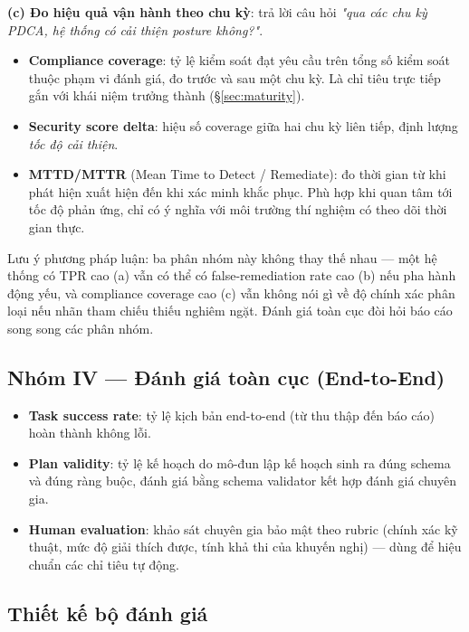 \textbf{(c) Đo hiệu quả vận hành theo chu kỳ}: trả lời câu hỏi \textit{"qua các chu kỳ PDCA, hệ thống có cải thiện posture không?"}.
\begin{itemize}
  \item \textbf{Compliance coverage}: tỷ lệ kiểm soát đạt yêu cầu trên tổng số kiểm soát thuộc phạm vi đánh giá, đo trước và sau một chu kỳ. Là chỉ tiêu trực tiếp gắn với khái niệm trưởng thành (§\ref{sec:maturity}).
  \item \textbf{Security score delta}: hiệu số coverage giữa hai chu kỳ liên tiếp, định lượng \textit{tốc độ cải thiện}.
  \item \textbf{MTTD/MTTR} (Mean Time to Detect / Remediate): đo thời gian từ khi phát hiện xuất hiện đến khi xác minh khắc phục. Phù hợp khi quan tâm tới tốc độ phản ứng, chỉ có ý nghĩa với môi trường thí nghiệm có theo dõi thời gian thực.
\end{itemize}

Lưu ý phương pháp luận: ba phân nhóm này không thay thế nhau --- một hệ thống có TPR cao (a) vẫn có thể có false-remediation rate cao (b) nếu pha hành động yếu, và compliance coverage cao (c) vẫn không nói gì về độ chính xác phân loại nếu nhãn tham chiếu thiếu nghiêm ngặt. Đánh giá toàn cục đòi hỏi báo cáo song song các phân nhóm.

\subsection{Nhóm IV --- Đánh giá toàn cục (End-to-End)}
\label{subsec:eval-e2e}

\begin{itemize}
  \item \textbf{Task success rate}: tỷ lệ kịch bản end-to-end (từ thu thập đến báo cáo) hoàn thành không lỗi.
  \item \textbf{Plan validity}: tỷ lệ kế hoạch do mô-đun lập kế hoạch sinh ra đúng schema và đúng ràng buộc, đánh giá bằng schema validator kết hợp đánh giá chuyên gia.
  \item \textbf{Human evaluation}: khảo sát chuyên gia bảo mật theo rubric (chính xác kỹ thuật, mức độ giải thích được, tính khả thi của khuyến nghị) --- dùng để hiệu chuẩn các chỉ tiêu tự động.
\end{itemize}

\subsection{Thiết kế bộ đánh giá}
\label{subsec:eval-design}

